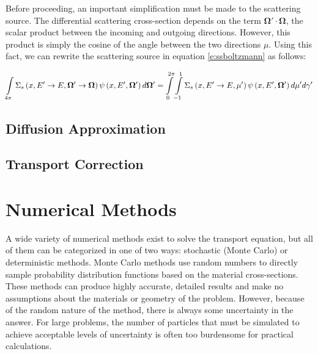 Before proceeding, an important simplification must be made to the scattering source.  The differential scattering cross-section depends on the term $\bm \Omega' \cdot \bm \Omega$, the scalar product between the incoming and outgoing directions.  However, this product is simply the cosine of the angle between the two directions $\mu$.  Using this fact, we can rewrite the scattering source in equation \ref{e:ssboltzmann} as follows:

\begin{equation}
\intop_{4\pi} \Sigma_s\left(x,E' \rightarrow E,\bm \Omega' \rightarrow \bm \Omega\right)\psi\left(x,E',\bm\Omega'\right)d\bm\Omega' = \intop_0^{2\pi} \intop_{-1}^1 \Sigma_s\left(x,E' \rightarrow E,\mu'\right) \psi\left(x,E',\bm\Omega'\right) d\mu' d\gamma'
\end{equation}


\subsection{Diffusion Approximation}


\subsection{Transport Correction}


\section{Numerical Methods}

A wide variety of numerical methods exist to solve the transport equation, but all of them can be categorized in one of two ways: stochastic (Monte Carlo) or deterministic methods.  Monte Carlo methods use random numbers to directly sample probability distribution functions based on the material cross-sections.  These methods can produce highly accurate, detailed results and make no assumptions about the materials or geometry of the problem.  However, because of the random nature of the method, there is always some uncertainty in the answer.  For large problems, the number of particles that must be simulated to achieve acceptable levels of uncertainty is often too burdensome  for practical calculations.

